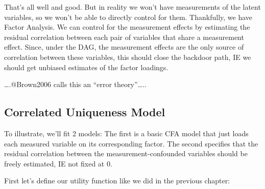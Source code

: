 \documentclass[
  letterpaper,
  DIV=11,
  numbers=noendperiod]{scrreprt}
\begin{document}
That's all well and good. But in reality we won't have measurements of
the latent variables, so we won't be able to directly control for them.
Thankfully, we have Factor Analysis. We can control for the measurement
effects by estimating the residual correlation between each pair of
variables that share a measurement effect. Since, under the DAG, the
measurement effects are the only source of correlation between these
variables, this should close the backdoor path, IE we should get
unbiased estimates of the factor loadings.

\ldots.@Brown2006 calls this an ``error theory''\ldots..

\hypertarget{correlated-uniqueness-model}{%
\subsection*{Correlated Uniqueness
Model}\label{correlated-uniqueness-model}}

To illustrate, we'll fit 2 models: The first is a basic CFA model that
just loads each measured variable on its corresponding factor. The
second specifies that the residual correlation between the
measurement-confounded variables should be freely estimated, IE not
fixed at 0.

First let's define our utility function like we did in the previous
chapter:
\end{document}

